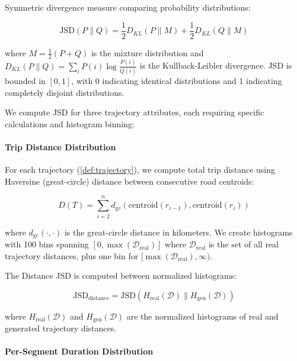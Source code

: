 Symmetric divergence measure comparing probability distributions:

\begin{equation}
\text{JSD}(P \parallel Q) = \frac{1}{2} D_{KL}(P \parallel M) + \frac{1}{2} D_{KL}(Q \parallel M)
\label{eq:jsd-appendix}
\end{equation}

where $M = \frac{1}{2}(P + Q)$ is the mixture distribution and $D_{KL}(P \parallel Q) = \sum_i P(i) \log \frac{P(i)}{Q(i)}$ is the Kullback-Leibler divergence. JSD is bounded in $[0, 1]$, with 0 indicating identical distributions and 1 indicating completely disjoint distributions.

We compute JSD for three trajectory attributes, each requiring specific calculations and histogram binning:

\paragraph{Trip Distance Distribution}

For each trajectory (\autoref{def:trajectory}), we compute total trip distance using Haversine (great-circle) distance between consecutive road centroids:

\begin{equation}
D(T) = \sum_{i=2}^{n} d_{\text{gc}}(\text{centroid}(r_{i-1}), \text{centroid}(r_i))
\label{eq:trip-distance}
\end{equation}

where $d_{\text{gc}}(\cdot, \cdot)$ is the great-circle distance in kilometers. We create histograms with 100 bins spanning $[0, \max(\mathcal{D}_{\text{real}})]$ where $\mathcal{D}_{\text{real}}$ is the set of all real trajectory distances, plus one bin for $[\max(\mathcal{D}_{\text{real}}), \infty)$.

The Distance JSD is computed between normalized histograms:

\begin{equation}
\text{JSD}_{\text{distance}} = \text{JSD}(H_{\text{real}}(\mathcal{D}) \parallel H_{\text{gen}}(\mathcal{D}))
\label{eq:distance-jsd}
\end{equation}

where $H_{\text{real}}(\mathcal{D})$ and $H_{\text{gen}}(\mathcal{D})$ are the normalized histograms of real and generated trajectory distances.

\paragraph{Per-Segment Duration Distribution}


